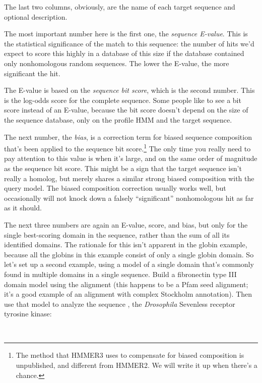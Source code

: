 The last two columns, obviously, are the name of each target sequence
and optional description.

The most important number here is the first one, the \emph{sequence
E-value}. This is the statistical significance of the match to this
sequence: the number of hits we'd expect to score this highly in a
database of this size if the database contained only nonhomologous
random sequences. The lower the E-value, the more significant the hit.

The E-value is based on the \emph{sequence bit score}, which is the
second number. This is the log-odds score for the complete sequence.
Some people like to see a bit score instead of an E-value, because the
bit score doesn't depend on the size of the sequence database, only on
the profile HMM and the target sequence.

The next number, the \emph{bias}, is a correction term for biased
sequence composition that's been applied to the sequence bit
score.\footnote{The method that HMMER3 uses to compensate for biased
composition is unpublished, and different from HMMER2. We will write
it up when there's a chance.} The only time you really need to pay
attention to this value is when it's large, and on the same order of
magnitude as the sequence bit score. This might be a sign that the
target sequence isn't really a homolog, but merely shares a similar
strong biased composition with the query model.  The biased
composition correction usually works well, but occasionally will not
knock down a falsely ``significant'' nonhomologous hit as far as it
should.

The next three numbers are again an E-value, score, and bias, but only
for the single best-scoring domain in the sequence, rather than the
sum of all its identified domains. The rationale for this isn't
apparent in the globin example, because all the globins in this
example consist of only a single globin domain. So let's set up a
second example, using a model of a single domain that's commonly found
in multiple domains in a single sequence. Build a fibronectin type III
domain model using the  alignment (this happens
to be a Pfam seed alignment; it's a good example of an alignment with
complex Stockholm annotation). Then use that model to analyze the
sequence , the \emph{Drosophila} Sevenless
receptor tyrosine kinase:

 \\

